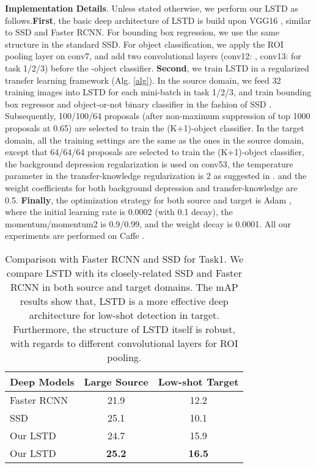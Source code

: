 \documentclass[letterpaper]{article} \usepackage{aaai18}  \usepackage{times}  \usepackage{helvet}  \usepackage{courier}  \usepackage{url}  \usepackage{graphicx}
\begin{document}
\textbf{Implementation Details}.
Unless stated otherwise,
we perform our LSTD as follows.\textbf{First},
the basic deep architecture of LSTD is build upon VGG16 \cite{simonyan2014very},
similar to SSD and Faster RCNN.
For bounding box regression,
we use the same structure in the standard SSD.
For object classification,
we apply the ROI pooling layer on conv7,
and add two convolutional layers (conv12: , conv13:  for task 1/2/3) before the -object classifier.
\textbf{Second},
we train LSTD in a regularized transfer learning framework (Alg. \ref{alg}).
In the source domain,
we feed 32 training images into LSTD for each mini-batch in task 1/2/3,
and train bounding box regressor and object-or-not binary classifier in the fashion of SSD \cite{Liueccv2016}.
Subsequently,
100/100/64 proposals (after non-maximum suppression of top 1000 proposals at 0.65) are selected to train the (K+1)-object classifier.
In the target domain,
all the training settings are the same as the ones in the source domain,
except that
64/64/64 proposals are selected to train the (K+1)-object classifier,
the background depression regularization is used on conv53,
the temperature parameter in the transfer-knowledge regularization is 2 as suggested in \cite{Hinton2015}.
and the weight coefficients for both background depression and transfer-knowledge are 0.5.
\textbf{Finally},
the optimization strategy for both source and target is Adam \cite{Kingma2015},
where
the initial learning rate is 0.0002 (with 0.1 decay),
the momentum/momentum2 is 0.9/0.99,
and the weight decay is 0.0001.
All our experiments are performed on Caffe \cite{jia2014caffe}.


\begin{table}[t]
\centering
\begin{tabular}{l|cc}
  \hline
Deep Models & Large Source & Low-shot Target\\
  \hline
  Faster RCNN & 21.9  & 12.2  \\
  SSD & 25.1 & 10.1 \\
  \hline
  Our LSTD & 24.7  & 15.9  \\
  Our LSTD & \textbf{25.2}  & \textbf{16.5}  \\
  \hline
\end{tabular}
\caption{Comparison with Faster RCNN and SSD for Task1.
We compare LSTD with its closely-related SSD \cite{Liueccv2016} and Faster RCNN \cite{Renpami2016} in both source and target domains.
The mAP results show that,
LSTD is a more effective deep architecture for low-shot detection in target.
Furthermore,
the structure of LSTD itself is robust,
with regards to different convolutional layers for ROI pooling.}
\label{LSTDSourceTarget}
\end{table}
\end{document}
